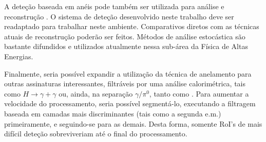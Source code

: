 A deteção baseada em anéis pode também ser utilizada para análise e
reconstrução . O sistema de deteção desenvolvido neste trabalho
deve ser readaptado para trabalhar neste ambiente. Comparativos diretos com as
técnicas atuais de reconstrução poderão ser feitos. Métodos de análise
estocástica são bastante difundidos e utilizados atualmente nessa sub-área da
Física de Altas Energias.

Finalmente, seria possível expandir a utilização da técnica de anelamento para
outras assinaturas interessantes, filtráveis por uma análise calorimétrica,
tais como $H \rightarrow \gamma + \gamma$ ou, ainda, na separação
$\gamma/\pi^0$, tanto  como . Para aumentar a
velocidade do processamento, seria possível segmentá-lo, executando a
filtragem baseada em camadas mais discriminantes (tais como a segunda e.m.)
primeiramente, e seguindo-se para as demais. Desta forma, somente RoI's de
mais difícil deteção sobreviveriam até o final do processamento.

